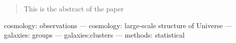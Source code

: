 
\begin{abstract}

This is the abstract of the paper

\end{abstract}


\begin{keywords}
cosmology: observations --- cosmology: large-scale structure
            of Universe --- galaxies: groups --- galaxies:clusters
            --- methods: statistical
\end{keywords}